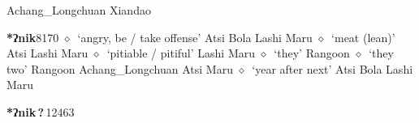 \begin{list}{}{\leftmargin=1.5em \itemindent=-1.5em}
         Achang\_Longchuan 
\hspace{1ex}
         Xiandao 
  \item {\footnotesize \textbf{*ʔnik}}{\tiny 8170}
\hspace{1ex}
         $\diamond$~`angry, be / take offense'
         Atsi 
\hspace{1ex}
         Bola 
\hspace{1ex}
         Lashi 
\hspace{1ex}
         Maru 
\hspace{1ex}
         $\diamond$~`meat (lean)'
         Atsi 
\hspace{1ex}
         Lashi 
\hspace{1ex}
         Maru 
\hspace{1ex}
         $\diamond$~`pitiable / pitiful'
         Lashi 
\hspace{1ex}
         Maru 
\hspace{1ex}
         $\diamond$~`they'
         Rangoon 
\hspace{1ex}
         $\diamond$~`they two'
         Rangoon 
\hspace{1ex}
         Achang\_Longchuan 
\hspace{1ex}
         Atsi 
\hspace{1ex}
         Maru 
\hspace{1ex}
         $\diamond$~`year after next'
         Atsi 
\hspace{1ex}
         Bola 
\hspace{1ex}
         Lashi 
\hspace{1ex}
         Maru 
  \item {\footnotesize \textbf{*ʔnik\,?\,}}{\tiny 12463}
\hspace{1ex}

\end{list}

